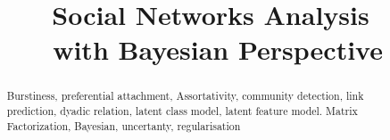 \documentclass[journal]{IEEEtran}
\title{Social Networks Analysis\\ with Bayesian Perspective}
\begin{document}
	
\maketitle
\begin{abstract}
Burstiness, preferential attachment, Assortativity, community detection, link prediction, dyadic relation, latent class model, latent feature model. Matrix Factorization, Bayesian, uncertanty, regularisation
\end{abstract}

\IEEEpeerreviewmaketitle















\end{document}
